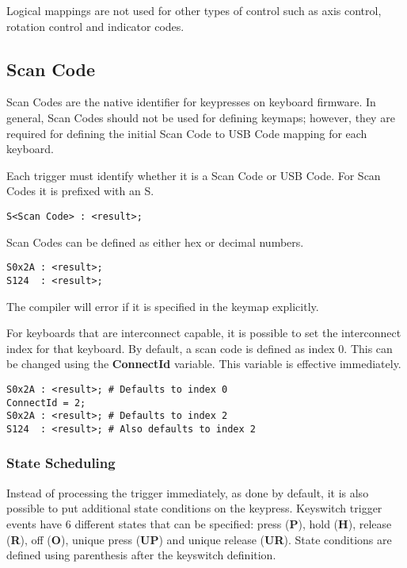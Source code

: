 \documentclass{kiibohd-template}
\begin{document}
Logical mappings are not used for other types of control such as axis control, rotation control and indicator codes.


\subsection{Scan Code}
\label{subsec:Scan_Code}

Scan Codes are the native identifier for keypresses on keyboard firmware.
In general, Scan Codes should not be used for defining keymaps; however, they are required for defining the initial Scan Code to USB Code mapping for each keyboard.

Each trigger must identify whether it is a Scan Code or USB Code.
For Scan Codes it is prefixed with an S.

\begin{lstlisting}
S<Scan Code> : <result>;
\end{lstlisting}

Scan Codes can be defined as either hex or decimal numbers.

\begin{lstlisting}
S0x2A : <result>;
S124  : <result>;
\end{lstlisting}

The compiler will error if it is specified in the keymap explicitly.

For keyboards that are interconnect capable, it is possible to set the interconnect index for that keyboard.
By default, a scan code is defined as index 0.
This can be changed using the \textbf{ConnectId} variable.
This variable is effective immediately.

\begin{lstlisting}
S0x2A : <result>; # Defaults to index 0
ConnectId = 2;
S0x2A : <result>; # Defaults to index 2
S124  : <result>; # Also defaults to index 2
\end{lstlisting}


\subsubsection{State Scheduling}
\label{subsubsec:ScanCodeStateScheduling}

Instead of processing the trigger immediately, as done by default, it is also possible to put additional state conditions on the keypress.
Keyswitch trigger events have 6 different states that can be specified: press (\textbf{P}), hold (\textbf{H}), release (\textbf{R}), off (\textbf{O}), unique press (\textbf{UP}) and unique release (\textbf{UR}).
State conditions are defined using parenthesis after the keyswitch definition.
\end{document}

